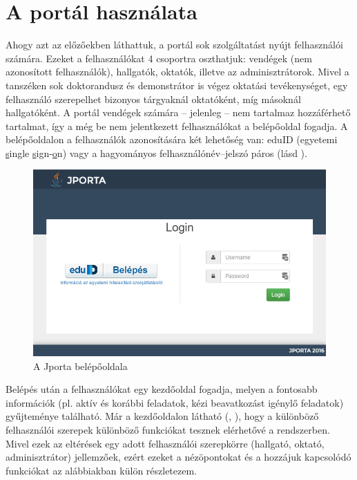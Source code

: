 \section{A portál használata}
Ahogy azt az előzőekben láthattuk, a portál sok szolgáltatást nyújt felhasználói számára. 
Ezeket a felhasználókat 4 csoportra oszthatjuk: vendégek (nem azonosított felhasználók), hallgatók, oktatók, illetve az adminisztrátorok.
Mivel a tanszéken sok doktorandusz és demonstrátor is végez oktatási tevékenységet, egy felhasználó szerepelhet bizonyos tárgyaknál oktatóként, míg másoknál hallgatóként.
A portál vendégek számára -- jelenleg -- nem tartalmaz hozzáférhető tartalmat, így a még be nem jelentkezett felhasználókat a belépőoldal fogadja.
A belépőoldalon a felhasználók azonosítására két lehetőség van: eduID (egyetemi \underline{s}ingle \underline{s}ign-\underline{o}n) vagy a hagyományos felhasználónév--jelszó páros (lásd ).
\begin{figure}[h]
    \centering
    \includegraphics[width=\textwidth]{figures/Jporta-login}
    \caption{A Jporta belépőoldala}
    \label{figure:jporta-login}
\end{figure}
Belépés után a felhasználókat egy kezdőoldal fogadja, melyen a fontosabb információk (pl. aktív és korábbi feladatok, kézi beavatkozást igénylő feladatok) gyűjteménye található.
Már a kezdőoldalon látható (, ), hogy a különböző felhasználói szerepek különböző funkciókat tesznek elérhetővé a rendszerben.
Mivel ezek az eltérések egy adott felhasználói szerepkörre (hallgató, oktató, adminisztrátor) jellemzőek, ezért ezeket a nézöpontokat és a hozzájuk kapcsolódó funkciókat az alábbiakban külön részletezem.

